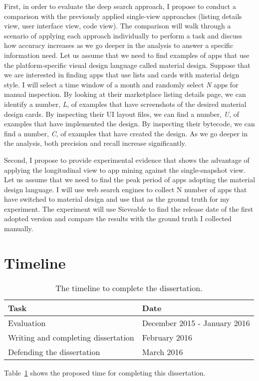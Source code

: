First, in order to evaluate the deep search approach, I propose to conduct a comparison with the previously applied single-view approaches (listing details view, user interface view, code view).
The comparison will walk through a scenario of applying each approach individually to perform a task and discuss how accuracy increases as we go deeper in the analysis to answer a specific information need.
Let us assume that we need to find examples of apps that use the platform-specific visual design language called material design.
Suppose that we are interested in finding apps that use lists and cards with material deign style.
I will select a time window of a month and randomly select \textit{N} apps for manual inspection.
By looking at their marketplace listing details page, we can identify a number, \textit{L}, of examples that have screenshots of the desired material design cards.
By inspecting their UI layout files, we can find a number, \textit{U}, of examples that have implemented the design.
By inspecting their bytecode, we can find a number, \textit{C}, of examples that have created the design.
As we go deeper in the analysis, both precision and recall increase significantly.

Second, I propose to provide experimental evidence that shows the advantage of applying the longitudinal view to app mining against the single-snapshot view.
Let us assume that we need to find the peak period of apps adopting the material design language.
I will use web search engines to collect N number of apps that have switched to material design and use that as the ground truth for my experiment.
The experiment will use Sieveable to find the release date of the first adopted version and compare the results with the ground truth I collected manually.

\section{Timeline}

\begin{table}
	\def\arraystretch{2}
	\centering
	\begin{tabular}{| l | l |}
		\hline
		Task & Date \\ \hline
		Evaluation & December 2015 - January 2016\\
		\hline
		Writing and completing dissertation & February 2016 \\
		\hline
		Defending the dissertation & March 2016 \\
		\hline
	\end{tabular}
	\caption{The timeline to complete the dissertation.}
	\label{tab:table_timeline}
\end{table}

Table~\ref{tab:table_timeline} shows the proposed time for completing this dissertation.

